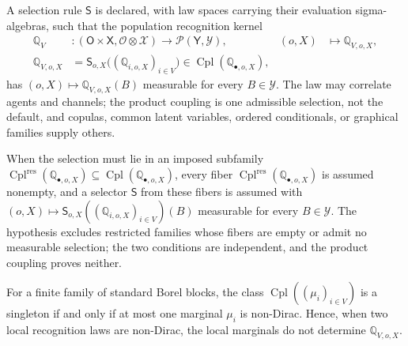 \label{def:elbo-recognition-kernel}
A selection rule $\mathsf S$ is declared, with law spaces carrying their evaluation sigma-algebras, such
that the population recognition kernel
\begin{align}
\mathbb Q_V&:(\mathsf O\times\mathsf X,\mathscr O\otimes\mathscr X)\longrightarrow\mathcal P(\mathsf Y,\mathscr Y),
&(o,X)&\longmapsto\mathbb Q_{V,o,X},
\label{eq:elbo-recognition-kernel}\\
\mathbb Q_{V,o,X}&=\mathsf S_{o,X}\bigl((\mathbb Q_{i,o,X})_{i\in V}\bigr)\in\operatorname{Cpl}(\mathbb Q_{\bullet,o,X}),
\label{eq:prob-selected-recognition-coupling}
\end{align}
has $(o,X)\mapsto\mathbb Q_{V,o,X}(B)$ measurable for every $B\in\mathscr Y$. The law may correlate agents
and channels; the product coupling is one admissible selection, not the default, and copulas, common latent
variables, ordered conditionals, or graphical families supply others.

When the selection must lie in an imposed subfamily
$\operatorname{Cpl}^{\mathrm{res}}(\mathbb Q_{\bullet,o,X})\subseteq\operatorname{Cpl}(\mathbb Q_{\bullet,o,X})$,
every fiber $\operatorname{Cpl}^{\mathrm{res}}(\mathbb Q_{\bullet,o,X})$ is assumed nonempty,
\label{hyp:prob-constrained-coupling-feasibility}
and a selector $\mathsf S$ from these fibers is assumed with
$(o,X)\mapsto\mathsf S_{o,X}((\mathbb Q_{i,o,X})_{i\in V})(B)$ measurable for every $B\in\mathscr Y$. The
hypothesis excludes restricted families whose fibers are empty or admit no measurable selection; the two
conditions are independent, and the product coupling proves neither.

For a finite family of standard Borel blocks, the class $\operatorname{Cpl}((\mu_i)_{i\in V})$ is a
singleton if and only if at most one marginal $\mu_i$ is non-Dirac. Hence, when two local recognition
laws are non-Dirac, the local marginals do not determine $\mathbb Q_{V,o,X}$. 

